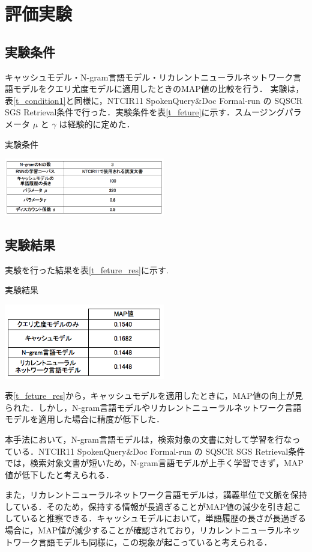 \section{評価実験}
\subsection{実験条件}

キャッシュモデル・N-gram言語モデル・リカレントニューラルネットワーク言語モデルをクエリ尤度モデルに適用したときのMAP値の比較を行う．
実験は，表\ref{t_condition1}と同様に，NTCIR11 SpokenQuery\&Doc Formal-run の SQSCR SGS Retrieval条件で行った．実験条件を表\ref{t_feture}に示す．スムージングパラメータ $\mu$ と $\gamma$ は経験的に定めた．

\begin{table}[h]
    \centering
    \caption{実験条件}
    \includegraphics[width=7cm]{./image/t_feature1_2.png}
    \label{t_feture}
\end{table}

\subsection{実験結果}

実験を行った結果を表\ref{t_feture_res}に示す.

\begin{table}[h]
    \centering
    \caption{実験結果}
    \includegraphics[width=7cm]{./image/t_feature2_1.png}
    \label{t_feture_res}
\end{table}

表\ref{t_feture_res}から，キャッシュモデルを適用したときに，MAP値の向上が見られた．しかし，N-gram言語モデルやリカレントニューラルネットワーク言語モデルを適用した場合に精度が低下した． 

本手法において，N-gram言語モデルは，検索対象の文書に対して学習を行なっている．NTCIR11 SpokenQuery\&Doc Formal-run の SQSCR SGS Retrieval条件では，検索対象文書が短いため，N-gram言語モデルが上手く学習できず，MAP値が低下したと考えられる．

また，リカレントニューラルネットワーク言語モデルは，講義単位で文脈を保持している．そのため，保持する情報が長過ぎることがMAP値の減少を引き起こしていると推察できる．キャッシュモデルにおいて，単語履歴の長さが長過ぎる場合に，MAP値が減少することが確認されており，リカレントニューラルネットワーク言語モデルも同様に，この現象が起こっていると考えられる．